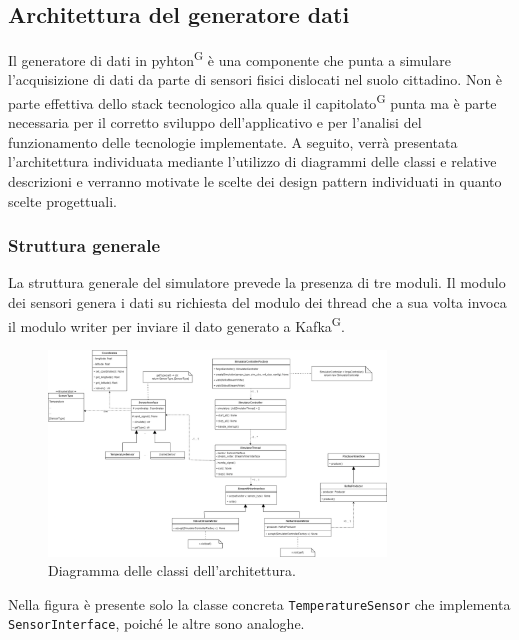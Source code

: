 \documentclass[8pt]{article}
\newcommand{\glossterm}[1]{#1\textsuperscript{G}} %
\begin{document}
\subsection{Architettura del generatore dati}
Il generatore di dati in \glossterm{pyhton} è una componente che punta a simulare l'acquisizione di dati da parte di sensori fisici dislocati nel suolo cittadino. Non è parte effettiva dello stack tecnologico alla quale il \glossterm{capitolato} punta ma è parte necessaria per il corretto sviluppo dell'applicativo e per l'analisi del funzionamento delle tecnologie implementate. A seguito, verrà presentata l’architettura individuata mediante l’utilizzo di diagrammi delle classi e relative descrizioni e verranno motivate le scelte dei design pattern individuati in quanto scelte progettuali.
\subsubsection{Struttura generale}
La struttura generale del simulatore prevede la presenza di tre moduli. Il modulo dei sensori genera i dati su richiesta del modulo dei thread che a sua volta invoca il modulo writer per inviare il dato generato a \glossterm{Kafka}.
\begin{figure}[h!]
    \centering
    \includegraphics[width=0.8\textwidth]{images_st/overview.png}
    \caption{Diagramma delle classi dell'architettura.}
    \label{fig:Diagramma delle classi dell'architettura}
\end{figure}
Nella figura è presente solo la classe concreta \verb|TemperatureSensor| che implementa \verb|SensorInterface|, poiché le altre sono analoghe.
\end{document}
